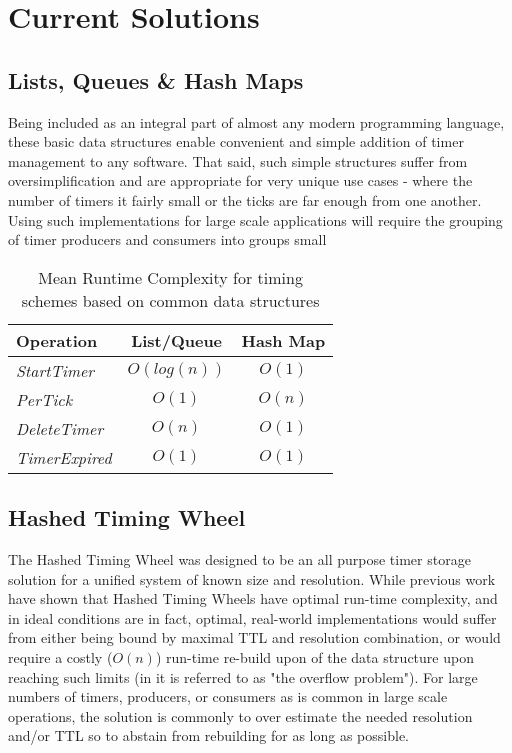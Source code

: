 \documentclass[twocolumn,a4paper]{article}
\begin{document}
\section{Current Solutions}

\subsection{Lists, Queues \& Hash Maps}
Being included as an integral part of almost any modern programming language, these basic data structures enable convenient and simple addition of timer management to any software. That said, such simple structures suffer from oversimplification and are appropriate for very unique use cases - where the number of timers it fairly small or the ticks are far enough from one another. Using such implementations for large scale applications will require the grouping of timer producers and consumers into groups small 



\begin{table}[h!]
	\begin{center}
		\begin{tabular}{l|c|c}
			\textbf{Operation} & \textbf{List/Queue} & \textbf{Hash Map} \\
			\hline
			\textit{StartTimer} & $O(log(n))$ & $O(1)$ \\
			\textit{PerTick} & $O(1)$ & $O(n)$ \\
			\textit{DeleteTimer} & $O(n)$ & $O(1)$ \\
			\textit{TimerExpired} & $O(1)$ & $O(1)$ \\
		\end{tabular}
		\caption{Mean Runtime Complexity for timing schemes based on common data structures}
		\label{tab:table1}
	\end{center}
\end{table}


\subsection{Hashed Timing Wheel}
The Hashed Timing Wheel was designed to be an all purpose timer storage solution for a unified system of known size and resolution\cite{TW87}\cite{TW}\cite{TWI}. While previous work have shown that Hashed Timing Wheels have optimal run-time complexity, and in ideal conditions are in fact, optimal, real-world implementations would suffer from either being bound by maximal TTL and resolution combination, or would require a costly ($O(n)$) run-time re-build upon of the data structure upon reaching such limits (in \cite{CQ} it is referred to as "the overflow problem"). For large numbers of timers, producers, or consumers as is common in large scale operations, the solution is commonly to over estimate the needed resolution and/or TTL so to abstain from rebuilding for as long as possible. 
\end{document}

